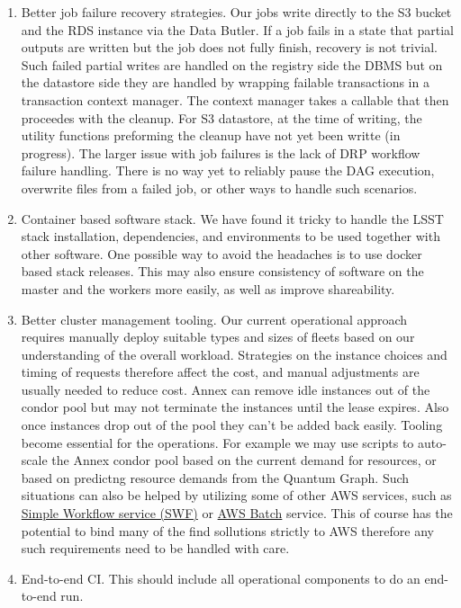 \begin{enumerate}
\item Better job failure recovery strategies.
Our jobs write directly to the S3 bucket and the RDS instance via the Data Butler.
If a job fails in a state that partial outputs are written but the job does not fully finish, recovery is not trivial. Such failed partial writes are handled on the registry side the DBMS but on the datastore side they are handled by wrapping failable transactions in a transaction context manager. The context manager takes a callable that then proceedes with the cleanup. For S3 datastore, at the time of writing, the utility functions preforming the cleanup have not yet been writte (in progress). The larger issue with job failures is the lack of DRP workflow failure handling. There is no way yet to reliably pause the DAG execution, overwrite files from a failed job, or other ways to handle such scenarios.
\item Container based software stack.
We have found it tricky to handle the LSST stack installation, dependencies, and environments to be used together with other software. One possible way to avoid the headaches is to use docker based stack releases. This may also ensure consistency of software on the master and the workers more easily, as well as improve shareability.
\item Better cluster management tooling.
Our current operational approach requires manually deploy suitable types and sizes of fleets based on our understanding of the overall workload.
Strategies on the instance choices and timing of requests therefore affect the cost, and manual adjustments are usually needed to reduce cost.
Annex can remove idle instances out of the condor pool but may not terminate the instances until the lease expires.
Also once instances drop out of the pool they can't be added back easily.
Tooling become essential for the operations.
For example we may use scripts to auto-scale the Annex condor pool based on the current demand for resources, or based on predictng resource demands from the Quantum Graph. Such situations can also be helped by utilizing some of other AWS services, such as \href{https://aws.amazon.com/swf/}{Simple Workflow service (SWF)} or \href{https://aws.amazon.com/batch/}{AWS Batch} service. This of course has the potential to bind many of the find sollutions strictly to AWS therefore any such requirements need to be handled with care.
\item End-to-end CI.
This should include all operational components to do an end-to-end run.

\end{enumerate}
